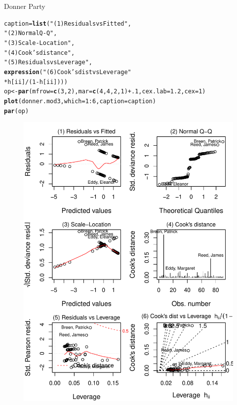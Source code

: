 \documentclass[11pt]{book}\usepackage[]{graphicx}\usepackage[]{color}
\makeatletter
\newcommand{\hlnum}[1]{\textcolor[rgb]{0.686,0.059,0.569}{#1}}%
\newcommand{\hlstr}[1]{\textcolor[rgb]{0.192,0.494,0.8}{#1}}%
\newcommand{\hlopt}[1]{\textcolor[rgb]{0,0,0}{#1}}%
\newcommand{\hlstd}[1]{\textcolor[rgb]{0.345,0.345,0.345}{#1}}%
\newcommand{\hlkwb}[1]{\textcolor[rgb]{0.69,0.353,0.396}{#1}}%
\newcommand{\hlkwc}[1]{\textcolor[rgb]{0.333,0.667,0.333}{#1}}%
\newcommand{\hlkwd}[1]{\textcolor[rgb]{0.737,0.353,0.396}{\textbf{#1}}}%
\newenvironment{kframe}{%
 \def\at@end@of@kframe{}%
 \ifinner\ifhmode%
  \def\at@end@of@kframe{\end{minipage}}%
  \begin{minipage}{\columnwidth}%
 \fi\fi%
 \def\FrameCommand##1{\hskip\@totalleftmargin \hskip-\fboxsep
 \colorbox{shadecolor}{##1}\hskip-\fboxsep
     \hskip-\linewidth \hskip-\@totalleftmargin \hskip\columnwidth}%
 \MakeFramed {\advance\hsize-\width
   \@totalleftmargin\z@ \linewidth\hsize
   \@setminipage}}%
 {\par\unskip\endMakeFramed%
 \at@end@of@kframe}
\newenvironment{knitrout}{}{} %
\renewenvironment{knitrout}{\small\renewcommand{\baselinestretch}{.85}}{} %
\makeatother
\begin{document}
\begin{Example}[donner2]{Donner Party}
\begin{knitrout}
\color{fgcolor}\begin{kframe}
\begin{alltt}
\hlstd{caption} \hlkwb{=} \hlkwd{list}\hlstd{(}\hlstr{"(1) Residuals vs Fitted"}\hlstd{,}
               \hlstr{"(2) Normal Q-Q"}\hlstd{,}
               \hlstr{"(3) Scale-Location"}\hlstd{,}
               \hlstr{"(4) Cook's distance"}\hlstd{,}
               \hlstr{"(5) Residuals vs Leverage"}\hlstd{,}
               \hlkwd{expression}\hlstd{(}\hlstr{"(6) Cook's dist vs Leverage  "}
                          \hlopt{*} \hlstd{h[ii]} \hlopt{/} \hlstd{(}\hlnum{1} \hlopt{-} \hlstd{h[ii])))}
\hlstd{op} \hlkwb{<-} \hlkwd{par}\hlstd{(}\hlkwc{mfrow}\hlstd{=}\hlkwd{c}\hlstd{(}\hlnum{3}\hlstd{,}\hlnum{2}\hlstd{),} \hlkwc{mar}\hlstd{=}\hlkwd{c}\hlstd{(}\hlnum{4}\hlstd{,}\hlnum{4}\hlstd{,}\hlnum{2}\hlstd{,}\hlnum{1}\hlstd{)}\hlopt{+}\hlnum{.1}\hlstd{,} \hlkwc{cex.lab}\hlstd{=}\hlnum{1.2}\hlstd{,} \hlkwc{cex}\hlstd{=}\hlnum{1}\hlstd{)}
\hlkwd{plot}\hlstd{(donner.mod3,} \hlkwc{which}\hlstd{=}\hlnum{1}\hlopt{:}\hlnum{6}\hlstd{,} \hlkwc{caption}\hlstd{=caption)}
\hlkwd{par}\hlstd{(op)}
\end{alltt}
\end{kframe}\begin{figure}[!htbp]


\centerline{\includegraphics[width=.9\textwidth]{ch07/fig/donner2-plot-1} }


\end{figure}
\end{knitrout}
\end{Example}
\end{document}
